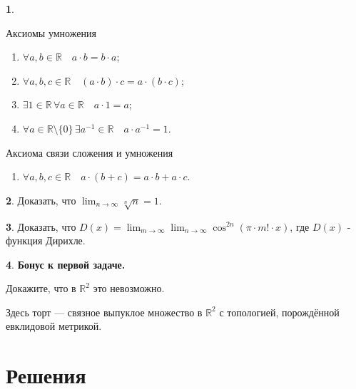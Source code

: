\documentclass[14pt, a4paper]{extarticle}
\theoremstyle{definition}
\newtheorem{problem}{}
\theoremstyle{definition}
\theoremstyle{remark}
\numberwithin{equation}{section}
\newcommand{\R}{\ensuremath{\mathbb{R}}}
\begin{document}
\begin{problem}
\begin{multicols*}{2}
{            Аксиомы умножения
            \begin{enumerate}
                \setcounter{enumi}{\theaxiomscounter}

                \item $\forall a, b \in \R \quad a \cdot b = b \cdot a$;
                \item $\forall a, b, c \in \R \quad (a \cdot b) \cdot c = a \cdot (b \cdot c)$;
                \item $\exists 1 \in \R \, \forall a \in \R \quad a \cdot 1 = a$;
                \item $\forall a \in \R \setminus \{0\} \, \exists a^{-1} \in \R \quad a \cdot a^{-1} = 1$.
                \setcounter{axiomscounter}{\theenumi}
            \end{enumerate}

            Аксиома связи сложения и умножения
            \begin{enumerate}
                \setcounter{enumi}{\theaxiomscounter}
                \item $\forall a, b, c \in \R \quad a \cdot (b + c) = a \cdot b + a \cdot c$.
            \end{enumerate}
        }

      \end{multicols*}
\end{problem}

\begin{problem}
    Доказать, что $\displaystyle\lim_{n\to\infty}{\sqrt[n]{n}} = 1.$
\end{problem}

\begin{problem}
    Доказать, что $D(x) = \displaystyle\lim_{m\to\infty}{\lim_{n\to\infty}
    {\cos^{2n}(\pi \cdot m! \cdot x)}}$, где $D(x)$ - функция Дирихле.
\end{problem}

\begin{problem}
    \textbf{Бонус к первой задаче.}

    Докажите, что в $\R^2$ это невозможно.

    Здесь торт --- связное выпуклое множество в $\R^2$ 
    с топологией, порождённой евклидовой метрикой.
\end{problem}

\newpage
\section*{Решения}
\end{document}
